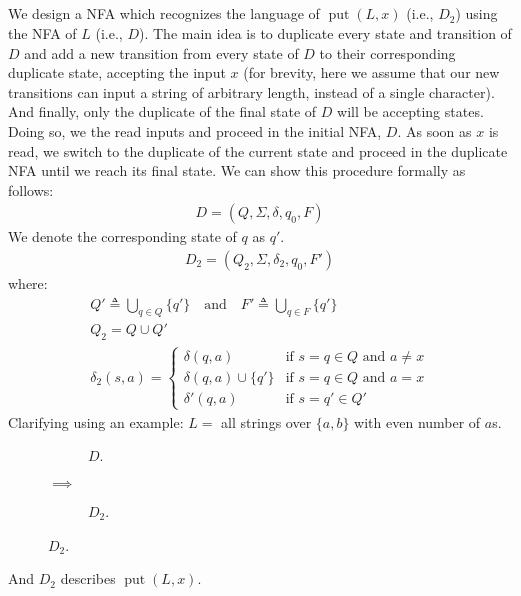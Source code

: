 \documentclass{article}
\numberwithin{equation}{subsection}
\DeclareMathOperator{\putx}{put}
\begin{document}
\subsection{}
We design a NFA which recognizes the language of \(\putx(L, x)\) (i.e., \(D_2\)) using the NFA of \(L\) (i.e., \(D\)).
The main idea is to duplicate every state and transition of \(D\) and add a new transition from every state of \(D\) to their corresponding duplicate state, accepting the input \(x\)
(for brevity, here we assume that our new transitions can input a string of arbitrary length, instead of a single character).
And finally, only the duplicate of the final state of \(D\) will be accepting states.
Doing so, we the read inputs and proceed in the initial NFA, \(D\).
As soon as \(x\) is read, we switch to the duplicate of the current state and proceed in the duplicate NFA until we reach its final state.
We can show this procedure formally as follows:
\begin{align}
D = (Q, \Sigma, \delta, q_0, F)
\end{align}
We denote the corresponding state of \(q\) as \(q'\).
\begin{align}
D_2 = (Q_2, \Sigma, \delta_2, q_0, F')
\end{align}
where:
\begin{gather}
Q' \triangleq \bigcup_{q \in Q} \{q'\} \quad \text{and} \quad F' \triangleq \bigcup_{q \in F}\{q'\}\\
Q_2 = Q \cup Q'\\
\delta_2(s, a) =
\begin{cases}
\delta(q, a) & \text{if } s=q \in Q \text{ and \(a\neq x\)}\\
\delta(q, a)\cup \{q'\} & \text{if } s=q \in Q \text{ and \(a=x\)}\\
\delta'(q, a)  & \text{if } s=q' \in Q'
\end{cases}
\end{gather}
Clarifying using an example: \(L=\) all strings over \(\{a, b\}\) with even number of \(a\)s.
\begin{figure}[H]
\centering
\begin{subfigure}[]{0.45\textwidth}
\centering

\caption{\(D\).}
\label{fig:automata4-1}
\end{subfigure}
\(\implies\)
\begin{subfigure}[]{0.45\textwidth}
\centering

\caption{\(D_2\).}
\label{fig:automata4-1-b}
\end{subfigure}
\end{figure}
And \(D_2\) describes \(\putx(L, x)\).
\end{document}
